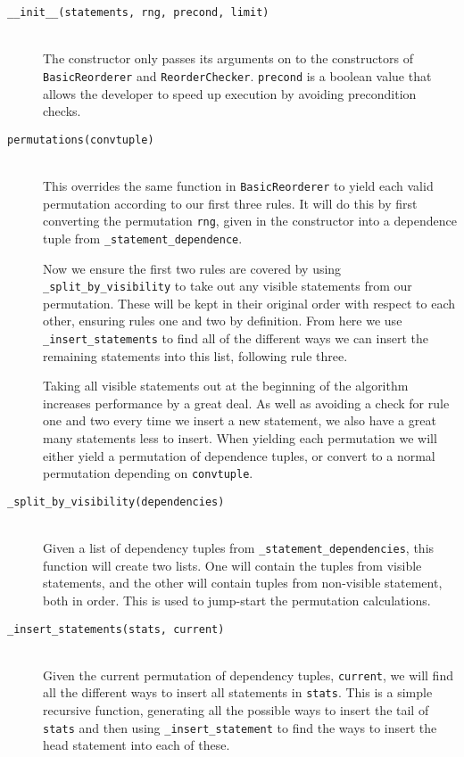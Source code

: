 \documentclass[twoside,a4paper]{report}
\begin{document}
\begin{description}
\item[\texttt{\_\_init\_\_(statements, rng, precond, limit)}] \hfill \\
The constructor only passes its arguments on to the constructors of \texttt{BasicReorderer} and \texttt{ReorderChecker}. \texttt{precond} is
a boolean value that allows the developer to speed up execution by avoiding precondition checks.

\item[\texttt{permutations(convtuple)}] \hfill \\
This overrides the same function in \texttt{BasicReorderer} to yield each valid permutation according to our first three rules. It will do this
by first converting the permutation \texttt{rng}, given in the constructor into a dependence tuple from \texttt{\_statement\_dependence}.

Now we ensure the first two rules are covered by using \texttt{\_split\_by\_visibility} to take out any visible statements from our permutation.
These will be kept in their original order with respect to each other, ensuring rules one and two by definition. From here we use
\texttt{\_insert\_statements} to find all of the different ways we can insert the remaining statements into this list, following rule three.

Taking all visible statements out at the beginning of the algorithm increases performance by a great deal. As well as avoiding a check for rule
one and two every time we insert a new statement, we also have a great many statements less to insert. When yielding each permutation we will
either yield a permutation of dependence tuples, or convert to a normal permutation depending on \texttt{convtuple}.

\item[\texttt{\_split\_by\_visibility(dependencies)}] \hfill \\
Given a list of dependency tuples from \texttt{\_statement\_dependencies}, this function will create two lists. One will contain the tuples from
visible statements, and the other will contain tuples from non-visible statement, both in order. This is used to jump-start the permutation
calculations.

\item[\texttt{\_insert\_statements(stats, current)}] \hfill \\
Given the current permutation of dependency tuples, \texttt{current}, we will find all the different ways to insert all statements in
\texttt{stats}. This is a simple recursive function, generating all the possible ways to insert the tail of \texttt{stats} and then using
\texttt{\_insert\_statement} to find the ways to insert the head statement into each of these.


\end{description}
\end{document}
